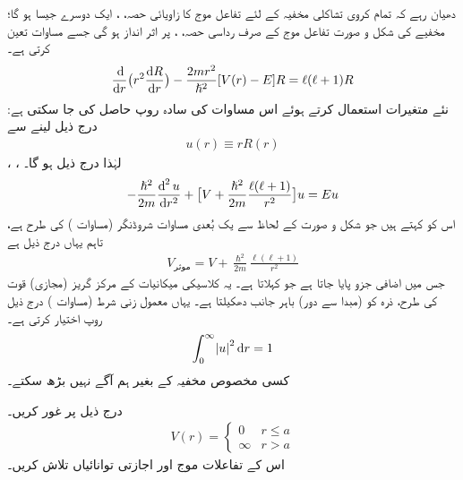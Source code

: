 دھیان رہے کہ تمام کروی تشاکلی  مخفیہ کے لئے تفاعل موج کا زاویائی حصہ، ،  ایک  دوسرے جیسا ہو گا؛ مخفیے    کی شکل و صورت تفاعل موج کے صرف رداسی حصہ، ، پر اثر انداز ہو گی جسے مساوات  تعین کرتی ہے۔
\begin{align}
\frac{\dif}{\dif r}\big(r^{2}\frac{\dif R}{\dif r}\big)-\frac{2mr^{2}}{\hslash^{2}}[V(r)-E]R=\ell(\ell+1)R
\end{align}
نئے متغیرات استعمال کرتے ہوئے اس مساوات کی سادہ روپ حاصل کی جا سکتی ہے: درج ذیل لینے سے
\begin{align}\label{مساوات_ابعادی_نئے_متغیر_رداسی}
u(r)\equiv{rR(r)} 
\end{align}  
، ،   لہٰذا درج ذیل ہو گا۔
\begin{align}\label{مساوات_ابعادی_رداسی}
-\frac{\hslash^{2}}{2m}\frac{\dif^{\,2}u}{\dif r^{2}}+\big[V+\frac{\hslash^{2}}{2m}\frac{\ell(\ell+1)}{r^{2}}\big]u=Eu
\end{align}
اس کو  کہتے ہیں جو شکل و صورت کے لحاظ سے یک بُعدی مساوات شروڈنگر (مساوات ) کی طرح ہے، تاہم یہاں  درج ذیل ہے
\begin{align}\label{مساوات_تین_ابعادی_موثر_مخفیہ}
V_{\text{موثر}}=V+\frac{\hslash^{2}}{2m}\frac{\ell(\ell+1)}{r^{2}} 
\end{align}
 جس میں   اضافی جزو پایا جاتا ہے جو  کہلاتا ہے۔ یہ کلاسیکی میکانیات کے مرکز گریز (مجازی) قوت کی طرح، ذرہ کو (مبدا سے دور) باہر جانب دھکیلتا ہے۔ یہاں معمول زنی شرط (مساوات ) درج ذیل روپ اختیار کرتی ہے۔ 
\begin{align}
\int_{0}^{\infty}\abs{u}^{2}\dif r=1 
\end{align}
کسی مخصوص مخفیہ    کے بغیر ہم آگے نہیں بڑھ سکتے۔

درج ذیل     پر غور کریں۔
\begin{align}
V(r)=\begin{cases}
0&r\le {a}\\
\infty&r>a
\end{cases} 
\end{align}
اس کے تفاعلات موج اور اجازتی توانائیاں تلاش کریں۔

